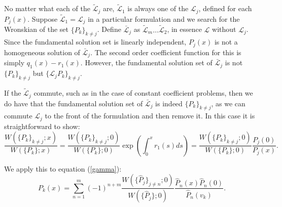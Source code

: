 \documentclass{book}
\begin{document}
No matter what each of the $\tilde{\mathcal{L}}_j$ are, $\tilde{\mathcal{L}}_1$ is always one of the $\mathcal{L}_j$, defined for each $P_j(x)$.
Suppose $\tilde{\mathcal{L}}_1 = \mathcal{L}_j$ in a particular formulation and we search for the Wronskian of the set $\{P_k\}_{k \neq j}$.
Define $\bar{\mathcal{L}}_j$ as $\tilde{\mathcal{L}}_m \dots \tilde{\mathcal{L}}_2$, in essence $\mathcal{L}$ without $\mathcal{L}_j$.
Since the fundamental solution set is linearly independent, $P_j(x)$ is not a homogeneous solution of $\bar{\mathcal{L}}_j$.
The second order coefficient function for this is simply $q_1(x) - r_1(x)$.
However, the fundamental solution set of $\bar{\mathcal{L}}_j$ is not $\{ P_k \}_{k \neq j}$ but $\{ \mathcal{L}_j P_k \}_{k \neq j}$.

If the $\tilde{\mathcal{L}}_j$ commute, such as in the case of constant coefficient problems, then we do have that the fundamental solution set of $\bar{\mathcal{L}}_j$ is indeed $\{ P_k \}_{k \neq j}$, as we can commute $\mathcal{L}_j$ to the front of the formulation and then remove it.
In this case it is straightforward to show:
\begin{equation*}
\frac{ W( \{P_k\}_{k\neq j} ; x )}{ W( \{P_k\} ; x ) } = \frac{ W( \{P_k\}_{k\neq j} ; 0 )}{ W( \{P_k\} ; 0 ) } \exp \left ( \int_0^x r_1(s) ds \right ) = \frac{ W( \{P_k\}_{k\neq j} ; 0 )}{ W( \{P_k\} ; 0 ) } \frac{P_j(0)}{P_j(x)} .
\end{equation*}

We apply this to equation (\ref{gamma}):
\begin{equation*}
P_k(x) = \sum_{n=1}^m (-1)^{n+m} \frac{ W(\{\hat{P}_j\}_{j \neq n} ; 0) }{ W(\{ \hat{P}_j \} ; 0) } \frac{ \hat{P}_n(x) \hat{P}_n(0)}{\hat{P}_n(v_k)}.
\end{equation*}
\end{document}
